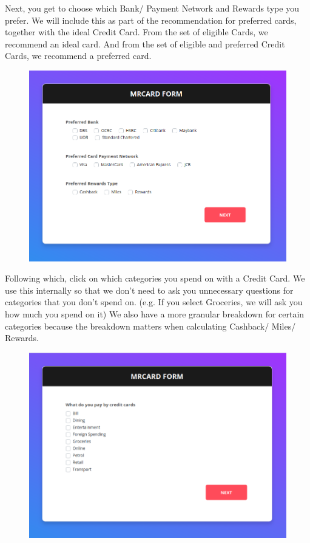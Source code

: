 		Next, you get to choose which Bank/ Payment Network and Rewards type you prefer. We will include this as part of the recommendation for preferred cards, together with the ideal Credit Card. From the set of eligible Cards, we recommend an ideal card. And from the set of eligible and preferred Credit Cards, we recommend a preferred card.

		\begin{figure}[H]
			\centering
			\includegraphics[width=\linewidth]{img/preferences.png}
		\end{figure}

		Following which, click on which categories you spend on with a Credit Card. We use this internally so that we don’t need to ask you unnecessary questions for categories that you don’t spend on. (e.g. If you select Groceries, we will ask you how much you spend on it) We also have a more granular breakdown for certain categories because the breakdown matters when calculating Cashback/ Miles/ Rewards.

		\begin{figure}[H]
			\centering
			\includegraphics[width=\linewidth]{img/spending_checkbox.png}
		\end{figure}


